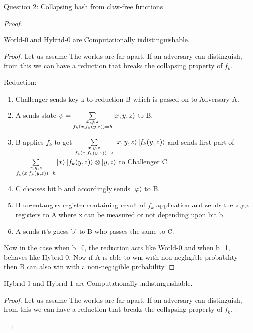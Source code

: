 \begin{solution}{Question 2: Collapsing hash from claw-free functions}
\begin{proof}
    \begin{claim}
    World-0 and Hybrid-0 are Computationally indistinguishable.
    \end{claim}
    \begin{proof}
        Let us assume The worlds are far apart, If an adversary can distinguish, from this we can have a reduction that breaks the collapsing property of $f_k$.

        Reduction:
        \begin{enumerate}
            \item Challenger sends key k to reduction B which is passed on to Adversary A.
            \item A sends state $\psi = \sum\limits_{\substack{x,y,z\\ f_k(x,f_k(y,z)) = h}} \ket{x,y,z}$ to B.
            \item B applies $f_k$ to get $\sum\limits_{\substack{x,y,z\\ f_k(x,f_k(y,z)) = h}}\ket{x,y,z}\ket{f_k(y,z)}$ and sends first part of  $\sum\limits_{\substack{x,y,z\\ f_k(x,f_k(y,z)) = h}}\ket{x}\ket{f_k(y,z)}\otimes\ket{y,z}$ to Challenger C.
            \item C chooses bit b and accordingly sends $\ket{\varphi}$ to B.
            \item B un-entangles register containing result of $f_k$ application and sends the x,y,z registers to A where x can be measured or not depending upon bit b.
            \item A sends it's guess b' to B who passes the same to C.
        \end{enumerate}

        Now in the case when b=0, the reduction acts like World-0 and when b=1, behaves like Hybrid-0. Now if A is able to win with non-negligible probability then B can also win with a non-negligible probability.

    \end{proof}
    \begin{claim}
    Hybrid-0 and Hybrid-1 are Computationally indistinguishable.
    \end{claim}
    \begin{proof}
        Let us assume The worlds are far apart, If an adversary can distinguish, from this we can have a reduction that breaks the collapsing property of $f_k$.


\end{proof}
\end{proof}
\end{solution}
